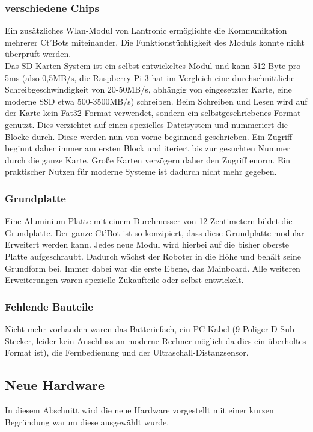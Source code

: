 \documentclass[twoside,12pt,a4paper]{report}
\begin{document}
	\subsubsection{verschiedene Chips}
	Ein zusätzliches Wlan-Modul von Lantronic ermöglichte die Kommunikation mehrerer Ct'Bots miteinander. Die Funktionstüchtigkeit des Moduls konnte nicht überprüft werden. \\
	Das SD-Karten-System ist ein selbst entwickeltes Modul und kann 512 Byte pro 5ms (also 0,5MB/s, die Raspberry Pi 3 hat im Vergleich eine durchschnittliche Schreibgeschwindigkeit von 20-50MB/s, abhängig von eingesetzter Karte, eine moderne SSD etwa 500-3500MB/s) schreiben. Beim Schreiben und Lesen wird auf der Karte kein Fat32 Format verwendet, sondern ein selbstgeschriebenes Format genutzt. Dies verzichtet auf einen spezielles Dateisystem und nummeriert die Blöcke durch. Diese werden nun von vorne beginnend geschrieben. Ein Zugriff beginnt daher immer am ersten Block und iteriert bis zur gesuchten Nummer durch die ganze Karte. Große Karten verzögern daher den Zugriff enorm. Ein praktischer Nutzen für moderne Systeme ist dadurch nicht mehr gegeben. 
	
	\subsubsection{Grundplatte}
	Eine Aluminium-Platte mit einem Durchmesser von 12 Zentimetern bildet die Grundplatte. Der ganze Ct'Bot ist so konzipiert, dass diese Grundplatte modular Erweitert werden kann. Jedes neue Modul wird hierbei auf die bisher oberste Platte aufgeschraubt. Dadurch wächst der Roboter in die Höhe und behält seine Grundform bei. Immer dabei war die erste Ebene, das Mainboard. Alle weiteren Erweiterungen waren spezielle Zukaufteile oder selbst entwickelt. 
	
	\subsubsection{Fehlende Bauteile}
	Nicht mehr vorhanden waren das Batteriefach, ein PC-Kabel (9-Poliger D-Sub-Stecker, leider kein Anschluss an moderne Rechner möglich da dies ein überholtes Format ist), die Fernbedienung und der Ultraschall-Distanzsensor. 
	
	\subsection{Neue Hardware}
	In diesem Abschnitt wird die neue Hardware vorgestellt mit einer kurzen Begründung warum diese ausgewählt wurde. 
	
\end{document}
